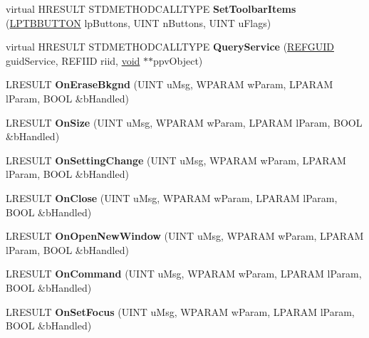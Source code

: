 \begin{DoxyCompactItemize}
\item 
\mbox{\label{class_c_desktop_browser_a2ce05488406d56663005cc467981e4c8}} 
virtual H\+R\+E\+S\+U\+LT S\+T\+D\+M\+E\+T\+H\+O\+D\+C\+A\+L\+L\+T\+Y\+PE {\bfseries Set\+Toolbar\+Items} (\hyperlink{struct___t_b_b_u_t_t_o_n}{L\+P\+T\+B\+B\+U\+T\+T\+ON} lp\+Buttons, U\+I\+NT n\+Buttons, U\+I\+NT u\+Flags)
\item 
\mbox{\label{class_c_desktop_browser_a3e54325e6064852a6b6e4cdd0351972b}} 
virtual H\+R\+E\+S\+U\+LT S\+T\+D\+M\+E\+T\+H\+O\+D\+C\+A\+L\+L\+T\+Y\+PE {\bfseries Query\+Service} (\hyperlink{struct___g_u_i_d}{R\+E\+F\+G\+U\+ID} guid\+Service, R\+E\+F\+I\+ID riid, \hyperlink{interfacevoid}{void} $\ast$$\ast$ppv\+Object)
\item 
\mbox{\label{class_c_desktop_browser_a4472ad5bdb4318b1e826d965c0d8e313}} 
L\+R\+E\+S\+U\+LT {\bfseries On\+Erase\+Bkgnd} (U\+I\+NT u\+Msg, W\+P\+A\+R\+AM w\+Param, L\+P\+A\+R\+AM l\+Param, B\+O\+OL \&b\+Handled)
\item 
\mbox{\label{class_c_desktop_browser_a6499f898eef890bef9677a611d8c3a38}} 
L\+R\+E\+S\+U\+LT {\bfseries On\+Size} (U\+I\+NT u\+Msg, W\+P\+A\+R\+AM w\+Param, L\+P\+A\+R\+AM l\+Param, B\+O\+OL \&b\+Handled)
\item 
\mbox{\label{class_c_desktop_browser_acc6e0e71b6384bde4e25a21ec42c70d0}} 
L\+R\+E\+S\+U\+LT {\bfseries On\+Setting\+Change} (U\+I\+NT u\+Msg, W\+P\+A\+R\+AM w\+Param, L\+P\+A\+R\+AM l\+Param, B\+O\+OL \&b\+Handled)
\item 
\mbox{\label{class_c_desktop_browser_ad0ad6ca81afe6ed7235a78ce7bebe374}} 
L\+R\+E\+S\+U\+LT {\bfseries On\+Close} (U\+I\+NT u\+Msg, W\+P\+A\+R\+AM w\+Param, L\+P\+A\+R\+AM l\+Param, B\+O\+OL \&b\+Handled)
\item 
\mbox{\label{class_c_desktop_browser_a67aba900b6f8ae3730bcb07f47ad0968}} 
L\+R\+E\+S\+U\+LT {\bfseries On\+Open\+New\+Window} (U\+I\+NT u\+Msg, W\+P\+A\+R\+AM w\+Param, L\+P\+A\+R\+AM l\+Param, B\+O\+OL \&b\+Handled)
\item 
\mbox{\label{class_c_desktop_browser_a55f9fa8f44214afd9b303d148f3e8d1e}} 
L\+R\+E\+S\+U\+LT {\bfseries On\+Command} (U\+I\+NT u\+Msg, W\+P\+A\+R\+AM w\+Param, L\+P\+A\+R\+AM l\+Param, B\+O\+OL \&b\+Handled)
\item 
\mbox{\label{class_c_desktop_browser_ab3be9626a8f605002a8b6486a6ec7eae}} 
L\+R\+E\+S\+U\+LT {\bfseries On\+Set\+Focus} (U\+I\+NT u\+Msg, W\+P\+A\+R\+AM w\+Param, L\+P\+A\+R\+AM l\+Param, B\+O\+OL \&b\+Handled)
\end{DoxyCompactItemize}
